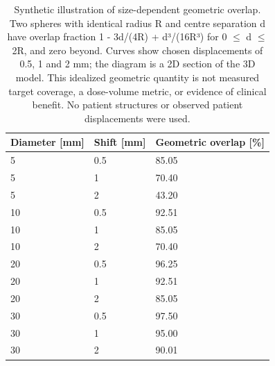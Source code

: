 \begin{table}
\caption{Synthetic illustration of size-dependent geometric overlap. Two spheres with identical radius R and centre separation d have overlap fraction 1 - 3d/(4R) + d³/(16R³) for 0 $\leq$ d $\leq$ 2R, and zero beyond. Curves show chosen displacements of 0.5, 1 and 2 mm; the diagram is a 2D section of the 3D model. This idealized geometric quantity is not measured target coverage, a dose-volume metric, or evidence of clinical benefit. No patient structures or observed patient displacements were used.}
\centering
\begin{tabular}{lll}
\hline
Diameter [mm] & Shift [mm] & Geometric overlap [\%] \\
\hline
5 & 0.5 & 85.05 \\
5 & 1 & 70.40 \\
5 & 2 & 43.20 \\
10 & 0.5 & 92.51 \\
10 & 1 & 85.05 \\
10 & 2 & 70.40 \\
20 & 0.5 & 96.25 \\
20 & 1 & 92.51 \\
20 & 2 & 85.05 \\
30 & 0.5 & 97.50 \\
30 & 1 & 95.00 \\
30 & 2 & 90.01 \\
\hline
\end{tabular}
\end{table}
